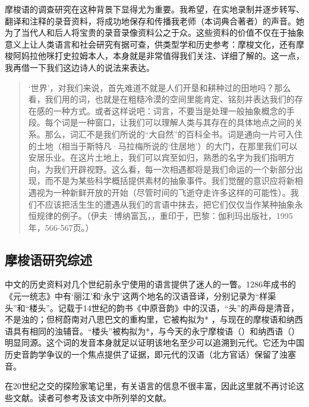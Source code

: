 摩梭语的调查研究在这种背景下显得尤为重要。我希望，在实地录制并逐步转写、翻译和注释的录音资料，将成功地保存和传播我老师（本词典合著者）的声音。她为了当代人和后人将宝贵的录音录像资料公之于众。这些资料的价值不仅在于抽象意义上让人类语言和社会研究有据可查，供类型学和历史参考：摩梭文化，还有摩梭阿妈拉他咪打史拉姆本人，本身就是非常值得我们关注、详细了解的。这一点，我再借一下我们这边诗人的说法来表达。

	\begin{quote}
    ‘世界’，对我们来说，首先难道不就是人们开垦和耕种过的田地吗？那么看，我们用的词，也就是在粗糙冷漠的空间里能肯定、铭刻并表达我们的存在感的一种方式。或者这样说吧：词言，不要当是处理一般抽象概念的手段。每个词是一种窗口，让我们可以理解人类与其存在的具体地点之间的关系。那么，词汇不是我们所说的“大自然”的百科全书。词是通向一片可入住的土地（相当于斯特凡·马拉梅所说的‘住居地’）的大门，在那里我们可以安居乐业。在这片土地上，我们可以宾至如归，熟悉的名字为我们指明方向，为我们开辟视野。这么看，每一次相遇都将是我们命运的一个新部分出现，而不是为某些科学概括提供素材的抽象事件。我们觉醒的意识应将新相遇视为一种新鲜开放的开始（尽管时间的飞逝夺走许多这样的可能性）。我们不应该把活生生的遭遇从我们的言语中抹去，把它们仅仅当作某种抽象永恒规律的例子。（伊夫·博纳富瓦，，重印于，巴黎：伽利玛出版社，1995年，566-567页。）
\end{quote}


\subsection{摩梭语研究综述}
\label{sec:previousstudiesofthenalanguage}


中文的历史资料对几个世纪前永宁使用的语言提供了迷人的一瞥。1286年成书的{《元一统志》}中有‘丽江’和‘永宁’这两个地名的汉语音译，分别记录为“样渠头”和“楼头”。记载于14世纪的韵书{《中原音韵》}中的汉语，“头”的声母是清音，不是浊的；但柯蔚南对八思巴文的重构里，它被构拟为* ，与现在的摩梭语和{纳西}语具有相同的浊辅音\parencite{coblin2007}。“楼头”被构拟为*，与今天的永宁摩梭语（）和{纳西}语（）明显同源。这个词的发音本身就足以证明该地名至少可以追溯到元代。它还为中国历史{音韵学}争议的一个焦点提供了{证据}，即元代的汉语（北方官话）保留了浊塞音\parencite[487]{jacquesetal2011}。

在20世纪之交的探险家笔记里，有关语言的信息不很丰富，因此这里就不再讨论这些文献。读者可参考\textcite{michaudetal2010}及该文中所列举的文献。



